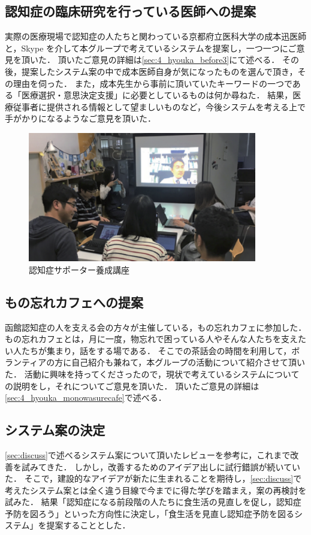 \documentclass[../report]{subfiles}
\begin{document}
\subsection{認知症の臨床研究を行っている医師への提案}
実際の医療現場で認知症の人たちと関わっている京都府立医科大学の成本迅医師と，Skype を介して本グループで考えているシステムを提案し，一つ一つにご意見を頂いた．
頂いたご意見の詳細は\ref{sec:4_hyouka_before3}にて述べる．
その後，提案したシステム案の中で成本医師自身が気になったものを選んで頂き，その理由を伺った．
また，成本先生から事前に頂いていたキーワードの一つである「医療選択・意思決定支援」に必要としているものは何か尋ねた．
結果，医療従事者に提供される情報として望ましいものなど，今後システムを考える上で手がかりになるようなご意見を頂いた．
\begin{figure}[htbp]
    \begin{center}
        \includegraphics[width=10cm]{imgs/2_idea_review2.png}
        \caption{認知症サポーター養成講座}
    \end{center}
\end{figure}

\subsection{もの忘れカフェへの提案} \label{sec:propose_cafe}
函館認知症の人を支える会の方々が主催している，もの忘れカフェに参加した．
もの忘れカフェとは，月に一度，物忘れで困っている人やそんな人たちを支えたい人たちが集まり，話をする場である．
そこでの茶話会の時間を利用して，ボランティアの方に自己紹介も兼ねて，本グループの活動について紹介させて頂いた．
活動に興味を持ってくださったので，現状で考えているシステムについての説明をし，それについてご意見を頂いた．
頂いたご意見の詳細は\ref{sec:4_hyouka_monowasurecafe}で述べる．

\subsection{システム案の決定} \label{sec:decision}
\ref{sec:discuss}で述べるシステム案について頂いたレビューを参考に，これまで改善を試みてきた．
しかし，改善するためのアイデア出しに試行錯誤が続いていた．
そこで，建設的なアイデアが新たに生まれることを期待し，\ref{sec:discuss}で考えたシステム案とは全く違う目線で今までに得た学びを踏まえ，案の再検討を試みた．
結果「認知症になる前段階の人たちに食生活の見直しを促し，認知症予防を図ろう」といった方向性に決定し，「食生活を見直し認知症予防を図るシステム」を提案することとした．
\end{document}

